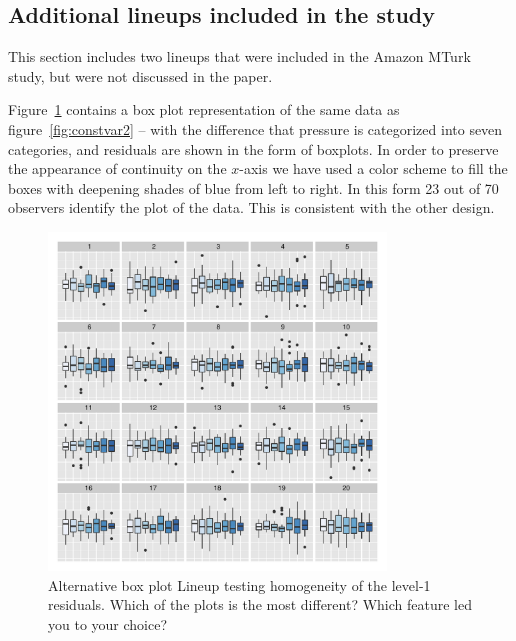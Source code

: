 \documentclass[12pt]{article} %
\begin{document}
\subsection{Additional lineups included in the study}\label{app:morelineups}

This section includes two lineups that were included in the Amazon MTurk study, but were not discussed in the paper. 

Figure~\ref{fig:constvar2.bp} contains a box plot representation of the same data as figure~\ref{fig:constvar2} -- with the  difference that pressure is categorized into seven categories, and residuals are shown in the form of boxplots. In order to preserve the appearance of continuity on the $x$-axis we have used a color scheme to fill the boxes with deepening shades of blue from left to right. In this form 23 out of 70 observers identify the plot of the data.  This is consistent with the other design.

\begin{figure}[hbt]
	\centering
	\includegraphics[width=0.8\textwidth]{dialyzerheterogeneous-bp-19.pdf}
	\caption{\label{fig:constvar2.bp} 
	Alternative box plot  Lineup testing homogeneity of the level-1 residuals. Which of the plots is the most different? Which feature led you to your choice?}
\end{figure}
\end{document}
